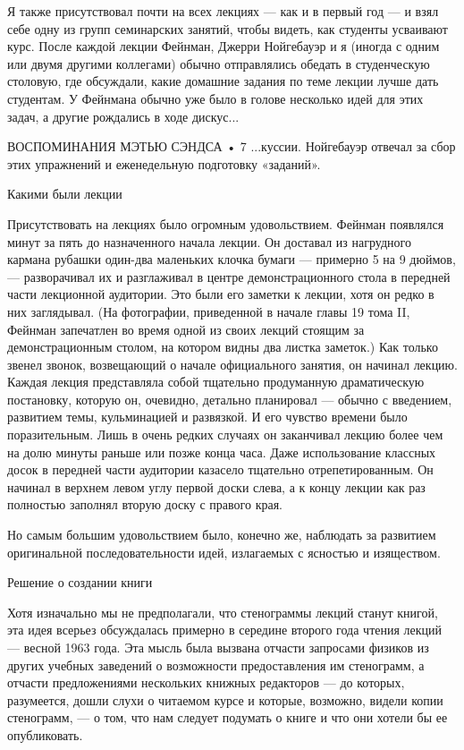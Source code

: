 \documentclass[10pt,oneside]{article}
\begin{document}
Я также присутствовал почти на всех лекциях --- как и в первый год --- и взял себе одну из групп семинарских занятий, чтобы видеть, как студенты усваивают курс. После каждой лекции Фейнман, Джерри Нойгебауэр и я (иногда с одним или двумя другими коллегами) обычно отправлялись обедать в студенческую столовую, где обсуждали, какие домашние задания по теме лекции лучше дать студентам. У Фейнмана обычно уже было в голове несколько идей для этих задач, а другие рождались в ходе дискус...\par

ВОСПОМИНАНИЯ МЭТЬЮ СЭНДСА • 7 ...куссии. Нойгебауэр отвечал за сбор этих упражнений и еженедельную подготовку «заданий».\par

Какими были лекции\par

Присутствовать на лекциях было огромным удовольствием. Фейнман появлялся минут за пять до назначенного начала лекции. Он доставал из нагрудного кармана рубашки один-два маленьких клочка бумаги --- примерно 5 на 9 дюймов, --- разворачивал их и разглаживал в центре демонстрационного стола в передней части лекционной аудитории. Это были его заметки к лекции, хотя он редко в них заглядывал. (На фотографии, приведенной в начале главы 19 тома II, Фейнман запечатлен во время одной из своих лекций стоящим за демонстрационным столом, на котором видны два листка заметок.) Как только звенел звонок, возвещающий о начале официального занятия, он начинал лекцию. Каждая лекция представляла собой тщательно продуманную драматическую постановку, которую он, очевидно, детально планировал --- обычно с введением, развитием темы, кульминацией и развязкой. И его чувство времени было поразительным. Лишь в очень редких случаях он заканчивал лекцию более чем на долю минуты раньше или позже конца часа. Даже использование классных досок в передней части аудитории казасело тщательно отрепетированным. Он начинал в верхнем левом углу первой доски слева, а к концу лекции как раз полностью заполнял вторую доску с правого края.\par

Но самым большим удовольствием было, конечно же, наблюдать за развитием оригинальной последовательности идей, излагаемых с ясностью и изяществом.\par

Решение о создании книги\par

Хотя изначально мы не предполагали, что стенограммы лекций станут книгой, эта идея всерьез обсуждалась примерно в середине второго года чтения лекций --- весной 1963 года. Эта мысль была вызвана отчасти запросами физиков из других учебных заведений о возможности предоставления им стенограмм, а отчасти предложениями нескольких книжных редакторов --- до которых, разумеется, дошли слухи о читаемом курсе и которые, возможно, видели копии стенограмм, --- о том, что нам следует подумать о книге и что они хотели бы ее опубликовать.\par
\end{document}
